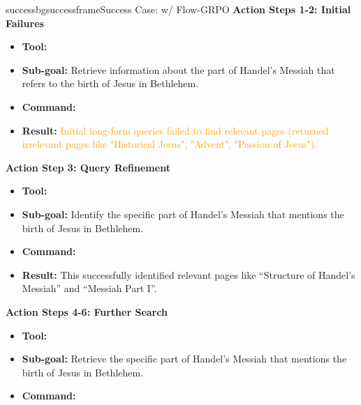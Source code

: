 \begin{small}
\begin{center}

\begin{casebox}{successbg}{successframe}{Success Case: \model w/ Flow-GRPO}
    \textbf{Action Steps 1-2: Initial Failures}
    \begin{itemize}[nosep, leftmargin=*]
        \item \textbf{Tool:} 
        \item \textbf{Sub-goal:} Retrieve information about the part of Handel's Messiah that refers to the birth of Jesus in Bethlehem.
        \item \textbf{Command:}

        \item \textbf{Result:} \textcolor{orange}{Initial long-form queries failed to find relevant pages (returned irrelevant pages like "Historical Jesus", "Advent", "Passion of Jesus").}
    \end{itemize}

    \vspace{1em}

    \textbf{Action Step 3: Query Refinement}
    \begin{itemize}[nosep, leftmargin=*]
        \item \textbf{Tool:} 
        \item \textbf{Sub-goal:} Identify the specific part of Handel's Messiah that mentions the birth of Jesus in Bethlehem.
        \item \textbf{Command:}

        \item \textbf{Result:} This successfully identified relevant pages like ``Structure of Handel's Messiah'' and ``Messiah Part I''.
    \end{itemize}

    \vspace{1em}

    \textbf{Action Steps 4-6: Further Search}
    \begin{itemize}[nosep, leftmargin=*]
        \item \textbf{Tool:} 
        \item \textbf{Sub-goal:} Retrieve the specific part of Handel's Messiah that mentions the birth of Jesus in Bethlehem.
        \item \textbf{Command:}


\end{itemize}
\end{casebox}
\end{center}
\end{small}
